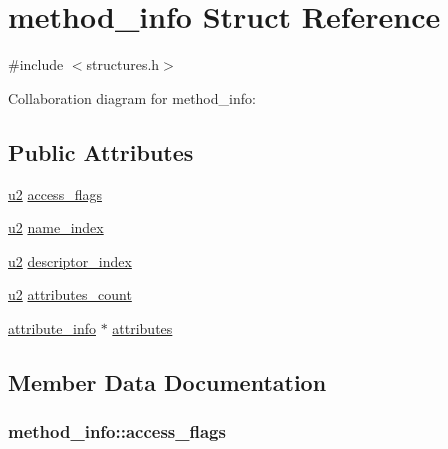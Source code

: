\hypertarget{structmethod__info}{}\section{method\+\_\+info Struct Reference}
\label{structmethod__info}


{\ttfamily \#include $<$structures.\+h$>$}



Collaboration diagram for method\+\_\+info\+:
\subsection*{Public Attributes}
\begin{DoxyCompactItemize}
\item 
\hyperlink{structures_8h_a55ef8d87fd202b8417704c089899c5b9}{u2} \hyperlink{structmethod__info_a3b657027a141cdbc94ded28607c98be5}{access\+\_\+flags}
\item 
\hyperlink{structures_8h_a55ef8d87fd202b8417704c089899c5b9}{u2} \hyperlink{structmethod__info_ab91d62d0658b77bba83f6bb685e3bbb9}{name\+\_\+index}
\item 
\hyperlink{structures_8h_a55ef8d87fd202b8417704c089899c5b9}{u2} \hyperlink{structmethod__info_a7713103e0c8d060630ad62774fb9be37}{descriptor\+\_\+index}
\item 
\hyperlink{structures_8h_a55ef8d87fd202b8417704c089899c5b9}{u2} \hyperlink{structmethod__info_ad9e5e1e2fc850806addadd6deab8565d}{attributes\+\_\+count}
\item 
\hyperlink{structattribute__info}{attribute\+\_\+info} $\ast$ \hyperlink{structmethod__info_a8ce4caaa03680c91f548558a38647ad8}{attributes}
\end{DoxyCompactItemize}


\subsection{Member Data Documentation}
\subsubsection[{\texorpdfstring{access\+\_\+flags}{access_flags}}]{ method\+\_\+info\+::access\+\_\+flags}\hypertarget{structmethod__info_a3b657027a141cdbc94ded28607c98be5}{}\label{structmethod__info_a3b657027a141cdbc94ded28607c98be5}
